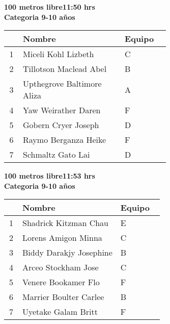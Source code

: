 \begin{minipage}{0.95\linewidth}\vspace{0.5cm} 
\begin{flushleft}
\textbf{
\hspace{-0.15cm}100 metros libre\hspace{1.5cm}11:50 hrs \\Categoria 9-10 años}\vspace{-0.2cm} 
\end{flushleft}
\begin{tabular}{cp{0.63\linewidth}l}
\hline
& \textbf{Nombre} & \textbf{Equipo} \\ \hline
1 & Miceli Kohl Lizbeth & C \\ 
2 & Tillotson Maclead Abel & B \\ 
3 & Upthegrove Baltimore Aliza & A \\ 
4 & Yaw Weirather Daren & F \\ 
5 & Gobern Cryer Joseph & D \\ 
6 & Raymo Berganza Heike & F \\ 
7 & Schmaltz Gato Lai & D \\ 
\end{tabular}
\end{minipage}
\begin{minipage}{0.95\linewidth}\vspace{0.5cm} 
\begin{flushleft}
\textbf{
\hspace{-0.15cm}100 metros libre\hspace{1.5cm}11:53 hrs \\Categoria 9-10 años}\vspace{-0.2cm} 
\end{flushleft}
\begin{tabular}{cp{0.63\linewidth}l}
\hline
& \textbf{Nombre} & \textbf{Equipo} \\ \hline
1 & Shadrick Kitzman Chau & E \\ 
2 & Lorens Amigon Minna & C \\ 
3 & Biddy Darakjy Josephine & B \\ 
4 & Arceo Stockham Jose & C \\ 
5 & Venere Bookamer Flo & F \\ 
6 & Marrier Boulter Carlee & B \\ 
7 & Uyetake Galam Britt & F \\ 
\end{tabular}
\end{minipage}
